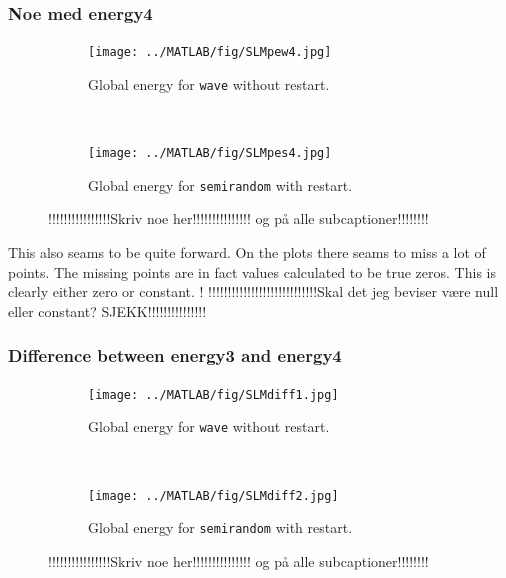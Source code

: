\subsubsection{Noe med energy4}%

\begin{figure}[H]
        \centering
        \begin{subfigure}[b]{0.45\textwidth}
                \texttt{[image: ../MATLAB/fig/SLMpew4.jpg]}
                \caption{Global energy for \texttt{wave} without restart.}
                \label{fig:SLMpew4}
        \end{subfigure}
		~
        \begin{subfigure}[b]{0.45\textwidth}
                \texttt{[image: ../MATLAB/fig/SLMpes4.jpg]}
                \caption{Global energy for \texttt{semirandom} with restart.}
                \label{fig:SLMpes4}
        \end{subfigure}
        \caption{ !!!!!!!!!!!!!!!!Skriv noe her!!!!!!!!!!!!!!! og på alle subcaptioner!!!!!!!!}
        \label{fig:SLMpe4x}
\end{figure}
This also seams to be quite forward. On the plots there seams to miss a lot of points. The missing points are in fact values calculated to be true zeros. This is clearly either zero or constant.
!
!!!!!!!!!!!!!!!!!!!!!!!!!!!!Skal det jeg beviser være null eller constant? SJEKK!!!!!!!!!!!!!!!\\
\subsubsection{Difference between energy3 and energy4}

\begin{figure}[H]
        \centering
        \begin{subfigure}[b]{0.45\textwidth}
                \texttt{[image: ../MATLAB/fig/SLMdiff1.jpg]}
                \caption{Global energy for \texttt{wave} without restart.}
                \label{fig:SLMdiff1}
        \end{subfigure}
		~
        \begin{subfigure}[b]{0.45\textwidth}
                \texttt{[image: ../MATLAB/fig/SLMdiff2.jpg]}
                \caption{Global energy for \texttt{semirandom} with restart.}
                \label{fig:SLMdiff2}
        \end{subfigure}
        \caption{ !!!!!!!!!!!!!!!!Skriv noe her!!!!!!!!!!!!!!! og på alle subcaptioner!!!!!!!!}
        \label{fig:SLMdiff}
\end{figure}